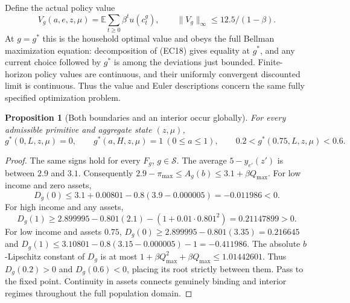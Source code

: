 \documentclass[11pt,a4paper]{article}
\newtheorem{proposition}[theorem]{Proposition}
\newcommand{\E}{\mathbb E}
\begin{document}
Define the actual policy value
\[
 V_g(a,e,z,\mu)=\E\sum_{t\geq0}\beta^t u(c_t^g),
 \qquad \|V_g\|_\infty\leq12.5/(1-\beta).
 \tag{EC18}
\]
At $g=g^*$ this is the household optimal value and obeys the full Bellman
maximization equation: decomposition of \textup{(EC18)} gives equality
at $g^*$, and any current choice followed by $g^*$ is among the deviations
just bounded. Finite-horizon policy values are continuous, and their
uniformly convergent discounted limit is continuous. Thus the value and
Euler descriptions concern the same fully specified optimization problem.

\begin{proposition}[Both boundaries and an interior occur globally]\label{prop:actual-binding}
For every admissible primitive and aggregate state $(z,\mu)$,
\[
 g^*(0,L,z,\mu)=0,\qquad
 g^*(a,H,z,\mu)=1\ (0\leq a\leq1),\qquad
 0.2<g^*(0.75,L,z,\mu)<0.6.
 \tag{EC19}
\]
\end{proposition}
\begin{proof}
The same signs hold for every $F_g$, $g\in\mathcal S$. The average
$5-y_{e'}(z')$ is between $2.9$ and $3.1$. Consequently
$2.9-\pi_{\max}\leq A_g(b)\leq3.1+\beta Q_{\max}$.
For low income and zero assets,
\[
 D_g(0)\leq3.1+0.00801-0.8(3.9-0.000005)=-0.011986<0.
\]
For high income and any assets,
\[
 D_g(1)\geq2.899995-0.801(2.1)-(1+0.01\cdot0.801^2)
 =0.21147899>0.
\]
For low income and assets $0.75$,
$D_g(0)\geq2.899995-0.801(3.35)=0.216645$ and
$D_g(1)\leq3.10801-0.8(3.15-0.000005)-1=-0.411986$.
The absolute $b$-Lipschitz constant of $D_g$ is at most
$1+\beta Q_{\max}^2+\beta Q_{\max}\leq1.01442601$.
Thus $D_g(0.2)>0$ and $D_g(0.6)<0$, placing its root strictly between
them. Pass to the fixed point. Continuity in assets connects genuinely
binding and interior regimes throughout the full population domain.
\end{proof}
\end{document}
